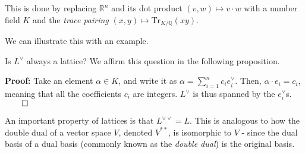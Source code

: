 \documentclass[a4paper, 12pt,oneside,openany]{book}
\begin{document}
This is done by replacing $\mathbb{R}^n$ and its dot product $(v, w) \mapsto v \cdot w$ with a number field $K$ and the \emph{trace pairing} $(x, y) \mapsto \text{Tr}_{K/\mathbb{Q}}(xy).$

We can illustrate this with an example. 


Is $L^{\vee}$ always a lattice? We affirm this question in the following proposition.


\textbf{Proof:} Take an element $\alpha \in K$, and write it as $\alpha = \sum\limits_{i=1}^n c_i e_i^{\vee}.$ Then, $\alpha\cdot e_i = c_i$, meaning that all the coefficients $c_i$ are integers. $L^{\vee}$ is thus spanned by the $e_i^{\vee}$s.  $\qed$

An important property of lattices is that $L^{\vee\vee}=L.$ This is analogous to how the double dual of a vector space $V$, denoted $V^{**}$, is isomorphic to $V$ - since the dual basis of a dual basis (commonly known as the \emph{double dual}) is the original basis.
\end{document}
